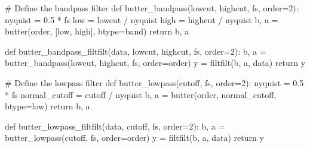 \documentclass[
  letterpaper,
  DIV=11,
  numbers=noendperiod]{scrreprt}
\newenvironment{Shaded}{\begin{snugshade}}{\end{snugshade}}
\newcommand{\CommentTok}[1]{\textcolor[rgb]{0.37,0.37,0.37}{#1}}
\newcommand{\ControlFlowTok}[1]{\textcolor[rgb]{0.00,0.23,0.31}{#1}}
\newcommand{\DecValTok}[1]{\textcolor[rgb]{0.68,0.00,0.00}{#1}}
\newcommand{\FloatTok}[1]{\textcolor[rgb]{0.68,0.00,0.00}{#1}}
\newcommand{\KeywordTok}[1]{\textcolor[rgb]{0.00,0.23,0.31}{#1}}
\newcommand{\NormalTok}[1]{\textcolor[rgb]{0.00,0.23,0.31}{#1}}
\newcommand{\OperatorTok}[1]{\textcolor[rgb]{0.37,0.37,0.37}{#1}}
\newcommand{\StringTok}[1]{\textcolor[rgb]{0.13,0.47,0.30}{#1}}
\begin{document}
\begin{Shaded}
\begin{Highlighting}[]
\CommentTok{\# Define the bandpass filter}
\KeywordTok{def}\NormalTok{ butter\_bandpass(lowcut, highcut, fs, order}\OperatorTok{=}\DecValTok{2}\NormalTok{):}
\NormalTok{    nyquist }\OperatorTok{=} \FloatTok{0.5} \OperatorTok{*}\NormalTok{ fs}
\NormalTok{    low }\OperatorTok{=}\NormalTok{ lowcut }\OperatorTok{/}\NormalTok{ nyquist}
\NormalTok{    high }\OperatorTok{=}\NormalTok{ highcut }\OperatorTok{/}\NormalTok{ nyquist}
\NormalTok{    b, a }\OperatorTok{=}\NormalTok{ butter(order, [low, high], btype}\OperatorTok{=}\StringTok{\textquotesingle{}band\textquotesingle{}}\NormalTok{)}
    \ControlFlowTok{return}\NormalTok{ b, a}

\KeywordTok{def}\NormalTok{ butter\_bandpass\_filtfilt(data, lowcut, highcut, fs, order}\OperatorTok{=}\DecValTok{2}\NormalTok{):}
\NormalTok{    b, a }\OperatorTok{=}\NormalTok{ butter\_bandpass(lowcut, highcut, fs, order}\OperatorTok{=}\NormalTok{order)}
\NormalTok{    y }\OperatorTok{=}\NormalTok{ filtfilt(b, a, data)}
    \ControlFlowTok{return}\NormalTok{ y}

\CommentTok{\# Define the lowpass filter}
\KeywordTok{def}\NormalTok{ butter\_lowpass(cutoff, fs, order}\OperatorTok{=}\DecValTok{2}\NormalTok{):}
\NormalTok{    nyquist }\OperatorTok{=} \FloatTok{0.5} \OperatorTok{*}\NormalTok{ fs}
\NormalTok{    normal\_cutoff }\OperatorTok{=}\NormalTok{ cutoff }\OperatorTok{/}\NormalTok{ nyquist}
\NormalTok{    b, a }\OperatorTok{=}\NormalTok{ butter(order, normal\_cutoff, btype}\OperatorTok{=}\StringTok{\textquotesingle{}low\textquotesingle{}}\NormalTok{)}
    \ControlFlowTok{return}\NormalTok{ b, a}

\KeywordTok{def}\NormalTok{ butter\_lowpass\_filtfilt(data, cutoff, fs, order}\OperatorTok{=}\DecValTok{2}\NormalTok{):}
\NormalTok{    b, a }\OperatorTok{=}\NormalTok{ butter\_lowpass(cutoff, fs, order}\OperatorTok{=}\NormalTok{order)}
\NormalTok{    y }\OperatorTok{=}\NormalTok{ filtfilt(b, a, data)}
    \ControlFlowTok{return}\NormalTok{ y}


\end{Highlighting}
\end{Shaded}
\end{document}
